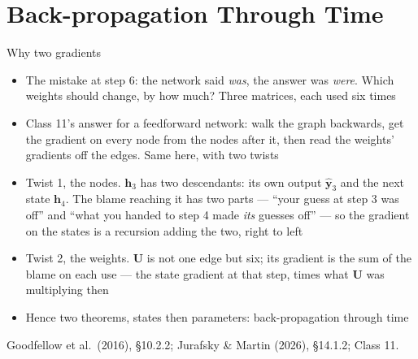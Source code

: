 \documentclass[aspectratio=169, 11pt]{beamer}
\newcommand{\srcline}[1]{%
  \par\vspace{0.25em}%
  {\scriptsize\color{mcMuted}\hfill #1\par}}
\begin{document}
\section{Back-propagation Through Time}

\begin{frame}{Why two gradients}
  \vspace{-0.25em}
  {\footnotesize
  \begin{itemize}\itemsep0.2em
    \item The mistake at step $6$: the network said \emph{was}, the
          answer was \emph{were}. Which weights should change, by how
          much? Three matrices, each used six times
    \item Class 11's answer for a feedforward network: walk the graph
          backwards, get the gradient on every \alert{node} from the nodes
          after it, then read the \alert{weights}' gradients off the edges.
          Same here, with two twists
    \item \alert{Twist 1, the nodes.} $\mathbf{h}_3$ has two descendants:
          its own output $\hat{\mathbf{y}}_3$ and the next state $\mathbf{h}_4$.
          The blame reaching it has two parts --- ``your guess at step 3
          was off'' and ``what you handed to step 4 made \emph{its}
          guesses off'' --- so the gradient on the states is a
          \alert{recursion} adding the two, right to left
    \item \alert{Twist 2, the weights.} $\mathbf{U}$ is not one edge but
          six; its gradient is the \alert{sum} of the blame on each use ---
          the state gradient at that step, times what $\mathbf{U}$ was
          multiplying then
    \item Hence two theorems, states then parameters: \alert{back-propagation through time}
  \end{itemize}}
  \srcline{Goodfellow et al.\ (2016), \S10.2.2; Jurafsky \& Martin (2026), \S14.1.2; Class 11.}
\end{frame}
\end{document}
